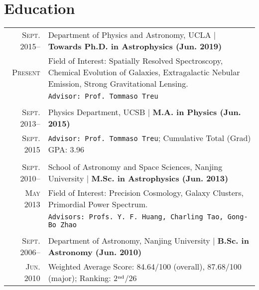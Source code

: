 \documentclass[letterpaper,10pt]{article}
\begin{document}
\section{Education}
\begin{tabular}{r|p{5.5in}}
  \textsc{Sept. 2015}--      &   Department of Physics and Astronomy, UCLA    |   \textbf{Towards Ph.D. in Astrophysics (Jun. 2019)}   \\
  \textsc{Present}
  & Field of Interest: Spatially Resolved Spectroscopy, Chemical Evolution of 
  Galaxies, Extragalactic Nebular Emission, Strong Gravitational Lensing. \\
  &   \texttt{Advisor: Prof. Tommaso Treu}     \\
  \multicolumn{2}{c}{} \\
  \textsc{Sept. 2013}--      &   Physics Department, UCSB    |   \textbf{M.A. in Physics (Jun. 2015)}   \\
  \textsc{Sept. 2015}
  &   \texttt{Advisor: Prof. Tommaso Treu}; \quad Cumulative Total (Grad) GPA: 3.96     \\
  \multicolumn{2}{c}{} \\
  \textsc{Sept. 2010}--     &   School of Astronomy and Space Sciences, Nanjing University  |  \textbf{M.Sc. in Astrophysics (Jun. 2013)}   \\
  \textsc{May 2013}
  & Field of Interest: Precision Cosmology, Galaxy Clusters, Primordial Power Spectrum. \\
  & \texttt{Advisors: Profs. Y. F. Huang, Charling Tao, Gong-Bo Zhao}   \\
  \multicolumn{2}{c}{} \\
  \textsc{Sept. 2006}--     &   Department of Astronomy, Nanjing University  |  \textbf{B.Sc. in Astronomy (Jun. 2010)}    \\
  \textsc{Jun. 2010}       &   Weighted Average Score: 84.64/100 (overall), 87.68/100 (major); Ranking: 2$^{\rm nd}$/26  \\
\end{tabular}

\vspace{1em}
\end{document}
